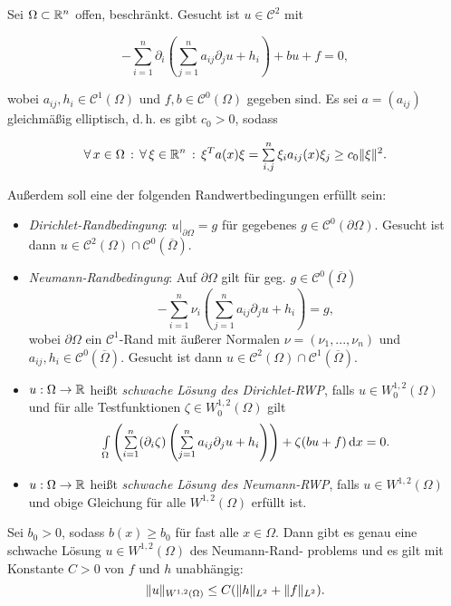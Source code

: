 \documentclass{cheat-sheet}
\begin{document}
\begin{prob}
  Sei $\Omega \subset \mathbb{R}^n$ offen, beschränkt. Gesucht ist $u \in \mathcal{C}^2$ mit

  \[ - \sum_{i=1}^n \partial_i \left( \sum_{j=1}^n a_{ij} \partial_j u + h_i \right) + bu + f = 0, \]

  wobei $a_{ij}, h_i \in \mathcal{C}^1(\Omega)$ und $f, b \in \mathcal{C}^0(\Omega)$ gegeben sind.
  Es sei $a = (a_{ij})$ gleichmäßig elliptisch, d.\,h. es gibt $c_0 > 0$, sodass

  \[ \fa{x \in \Omega} \fa{\xi \in \R^n} \xi^T a(x) \xi = \sum_{i,j}^n \xi_i a_{ij}(x) \xi_j \geq c_0 \norm{\xi}^2. \]

  Außerdem soll eine der folgenden Randwertbedingungen erfüllt sein:

  \begin{itemize}
    \item \emph{Dirichlet-Randbedingung}: $u|_{\partial \Omega} = g$ für gegebenes $g \in \mathcal{C}^0(\partial \Omega)$. Gesucht ist dann $u \in \mathcal{C}^2(\Omega) \cap \mathcal{C}^0(\overline{\Omega})$.
    \item \emph{Neumann-Randbedingung}: Auf $\partial \Omega$ gilt für geg. $g \in \mathcal{C}^0(\overline{\Omega})$
    \[ - \sum_{i=1}^n \nu_i \left( \sum_{j=1}^n a_{ij} \partial_j u + h_i \right) = g, \]
    wobei $\partial \Omega$ ein $\mathcal{C}^1$-Rand mit äußerer Normalen $\nu = (\nu_1, ..., \nu_n)$ und $a_{ij}, h_i \in \mathcal{C}^0(\overline{\Omega})$. Gesucht ist dann $u \in \mathcal{C}^2(\Omega) \cap \mathcal{C}^1(\overline{\Omega})$.
  \end{itemize}
\end{prob}

\begin{defn}
  \begin{itemize}
    \item $u : \Omega \to \mathbb{R}$ heißt \emph{schwache Lösung des Dirichlet-RWP}, falls $u \in W^{1,2}_0(\Omega)$ und für alle Testfunktionen $\zeta \in W_0^{1,2}(\Omega)$ gilt
    \[ \Int{\Omega}{}{\left(\sum_{i=1}^n (\partial_i \zeta) \left( \sum_{j=1}^n a_{ij} \partial_j u + h_i \right) \right) + \zeta (bu + f)}{x} = 0. \]
    \item $u : \Omega \to \mathbb{R}$ heißt \emph{schwache Lösung des Neumann-RWP}, falls $u \in W^{1,2}(\Omega)$ und obige Gleichung für alle $W^{1,2}(\Omega)$ erfüllt ist.
  \end{itemize}
\end{defn}

\begin{satz}
  Sei $b_0 > 0$, sodass $b(x) \geq b_0$ für fast alle $x \in \Omega$. Dann gibt es genau eine schwache Lösung $u \in W^{1,2}(\Omega)$ des Neumann-Rand- problems und es gilt mit Konstante $C > 0$ von $f$ und $h$ unabhängig:
  \[ \lVert u\rVert_{W^{1,2}(\Omega)} \leq C (\lVert h\rVert_{L^2} + \lVert f\rVert_{L^2}). \]
\end{satz}
\end{document}
